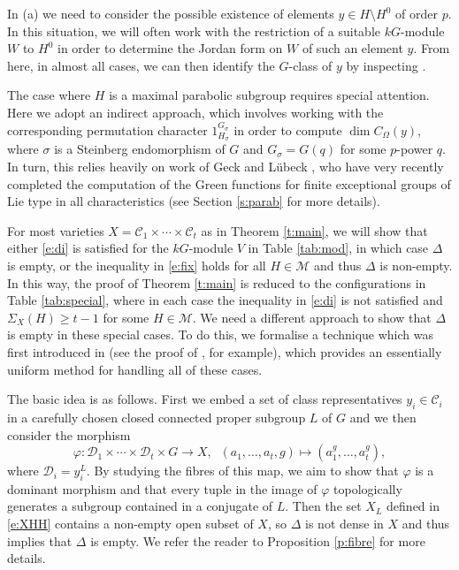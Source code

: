 \documentclass[twoside,a4paper,reqno,11pt]{amsart}
\newcommand{\s}{\sigma}
\renewcommand{\O}{\Omega}
\newcommand{\<}{\langle}
\renewcommand{\>}{\rangle}
\newcommand{\geqs}{\geqslant}
\renewcommand{\:}{\colon}
\theoremstyle{plain}
\theoremstyle{definition}
\begin{document}
In (a) we need to consider the possible existence of elements $y \in H \setminus H^0$ of order $p$. In this situation, we will often work with the restriction of a suitable $kG$-module $W$ to $H^0$ in order to determine the Jordan form on $W$ of such an element $y$. From here, in almost all cases, we can then identify the $G$-class of $y$ by inspecting \cite{Law1}. 

The case where $H$ is a maximal parabolic subgroup requires special attention. Here we adopt an indirect approach, which involves working with the corresponding permutation character $1^{G_{\s}}_{H_{\s}}$ in order to compute $\dim C_{\O}(y)$, where $\s$ is a Steinberg endomorphism of $G$ and $G_{\s} = G(q)$ for some $p$-power $q$. In turn, this relies heavily on work of Geck and L\"{u}beck \cite{Geck,Lub}, who have very recently completed the computation of the Green functions for finite exceptional groups of Lie type in all characteristics (see Section \ref{s:parab} for more details).

For most varieties $X = \mathcal{C}_1 \times \cdots \times \mathcal{C}_t$ as in Theorem \ref{t:main}, we will show that either \eqref{e:di} is satisfied for the $kG$-module $V$ in Table \ref{tab:mod}, in which case $\Delta$ is empty, or the inequality in \eqref{e:fix} holds for all $H \in \mathcal{M}$ and thus $\Delta$ is non-empty. In this way, the proof of Theorem \ref{t:main} is reduced to the configurations in Table \ref{tab:special}, where in each case the inequality in \eqref{e:di} is not satisfied and $\Sigma_X(H) \geqs t-1$ for some $H \in \mathcal{M}$. We need a different approach to show that $\Delta$ is empty in these special cases. To do this, we formalise a technique which was first introduced in \cite{BGG2} (see the proof of \cite[Lemma 4.1]{BGG2}, for example), which provides an essentially uniform method for handling all of these cases. 

The basic idea is as follows. First we embed a set of class representatives $y_i \in \mathcal{C}_i$ in a carefully chosen closed connected proper subgroup $L$ of $G$ and we then consider the morphism
\[
\varphi: \mathcal{D}_1 \times \cdots \times \mathcal{D}_t \times G \to X, \;\; (a_1,\ldots, a_t,g) \mapsto (a_1^g, \ldots, a_t^g),
\]
where $\mathcal{D}_i = y_i^L$. By studying the fibres of this map, we aim to show that $\varphi$ is a dominant morphism and that every tuple in the image of $\varphi$ topologically generates a subgroup contained in a conjugate of $L$. Then the set $X_L$ defined in \eqref{e:XHH} contains a non-empty open subset of $X$, so $\Delta$ is not dense in $X$ and thus \cite[Theorem 2]{BGG1} implies that $\Delta$ is empty. We refer the reader to Proposition \ref{p:fibre} for more details.
\end{document}
